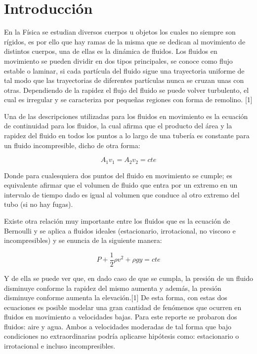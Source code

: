 \documentclass[10pt,a4paper]{article}
\begin{document}
\normalsize
\newpage


\section{Introducción}

En la Física se estudian diversos cuerpos u objetos los cuales no siempre son rígidos, es por ello que hay ramas de la misma que se dedican al movimiento de distintos cuerpos, una de ellas es la dinámica de fluidos. Los fluidos en movimiento se pueden dividir en dos tipos principales, se conoce como flujo estable o laminar, si cada partícula del fluido sigue una trayectoria uniforme de tal modo que las trayectorias de diferentes partículas nunca se cruzan unas con otras. Dependiendo de la rapidez el flujo del fluido se puede volver turbulento, el cual es irregular y se caracteriza por pequeñas regiones con forma de remolino. [1]

Una de las descripciones utilizadas para los fluidos en movimiento es la ecuación de continuidad para los fluidos, la cual afirma que el producto del área y la rapidez del fluido en todos los puntos a lo largo de una tubería es constante para un fluido incompresible, dicho de otra forma: 

\begin{equation}
	A_1 v_1 = A_2 v_2 = cte
\end{equation}

Donde para cualesquiera dos puntos del fluido en movimiento se cumple;  es equivalente afirmar que el volumen de fluido que entra por un extremo en un intervalo de tiempo dado es igual al volumen que conduce al otro extremo del tubo (si no hay fugas).

Existe otra relación muy importante entre los fluidos que es la ecuación de Bernoulli y se aplica a fluidos ideales (estacionario, irrotacional, no viscoso e incompresibles) y se enuncia de la siguiente manera:

\begin{equation}
	P + \frac{1}{2}\rho v^2 + \rho g y = cte 
\end{equation}

Y de ella se puede ver que, en dado caso de que se cumpla, la presión de un fluido disminuye conforme la rapidez del mismo aumenta y además, la presión disminuye conforme aumenta la elevación.[1] De esta forma, con estas dos ecuaciones es posible modelar una gran cantidad de fenómenos que ocurren en fluidos en movimiento a velocidades bajas. Para este reporte se probaron dos fluidos: aire y agua. Ambos a velocidades moderadas de tal forma que bajo condiciones no extraordinarias podría aplicarse hipótesis como: estacionario o irrotacional e incluso  incompresibles. 
\end{document}
